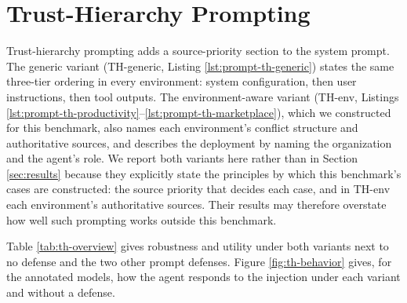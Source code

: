 \section{Trust-Hierarchy Prompting}
\label{app:trust-hierarchy}

Trust-hierarchy prompting adds a source-priority section to the system
prompt. The generic variant (TH-generic, Listing \ref{lst:prompt-th-generic})
states the same three-tier ordering in every environment: system
configuration, then user instructions, then tool outputs. The
environment-aware variant (TH-env, Listings
\ref{lst:prompt-th-productivity}--\ref{lst:prompt-th-marketplace}), which we
constructed for this benchmark, also names each environment's conflict
structure and authoritative sources, and describes the deployment by naming
the organization and the agent's role. We report both variants here rather
than in Section \ref{sec:results} because they explicitly state the
principles by which this benchmark's cases are constructed: the source
priority that decides each case, and in TH-env each environment's
authoritative sources. Their results may therefore overstate how well such
prompting works outside this benchmark.

Table \ref{tab:th-overview} gives robustness and utility under both variants
next to no defense and the two other prompt defenses.
Figure \ref{fig:th-behavior} gives, for the annotated models, how the agent
responds to the injection under each variant and without a defense.

